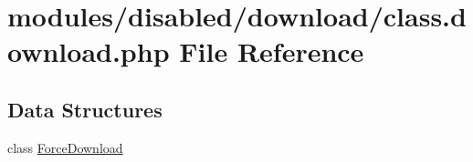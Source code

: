 \hypertarget{class_8download_8php}{\section{modules/disabled/download/class.download.\-php File Reference}
\label{class_8download_8php}
}
\subsection*{Data Structures}
\begin{DoxyCompactItemize}
\item 
class \hyperlink{class_force_download}{Force\-Download}
\end{DoxyCompactItemize}
